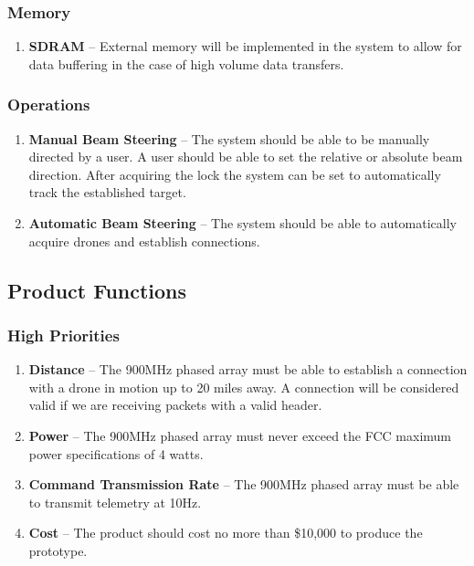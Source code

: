 \documentclass[ProductRequirements.tex]{subfiles}
\begin{document}
		\subsubsection{Memory}
			\begin{enumerate}\itemsep1pt
				\item \textbf{SDRAM} -- External memory will be implemented in the system to allow for data buffering in the case of high volume data transfers.  
			\end{enumerate}
		
		\subsubsection{Operations}
			\begin{enumerate}\itemsep1pt
				\item \textbf{Manual Beam Steering} -- The system should be able to be manually directed by a user.  A user should be able to set the relative or absolute beam direction.  After acquiring the lock the system can be set to automatically track the established target.
				\item \textbf{Automatic Beam Steering} -- The system should be able to automatically acquire drones and establish connections.
			\end{enumerate}
		
	\subsection{Product Functions}
	
		\subsubsection{High Priorities}
			\begin{enumerate}
				\item \textbf{Distance} -- The 900MHz phased array must be able to establish a connection with a drone in motion up to 20 miles away. A connection will be considered valid if we are receiving packets with a valid header.
				\item \textbf{Power} -- The 900MHz phased array must never exceed the FCC maximum power specifications of 4 watts.
				\item \textbf{Command Transmission Rate} -- The 900MHz phased array must be able to transmit telemetry at 10Hz.
				\item \textbf{Cost} -- The product should cost no more than \$10,000 to produce the prototype.
							
			\end{enumerate}
		
\end{document}
